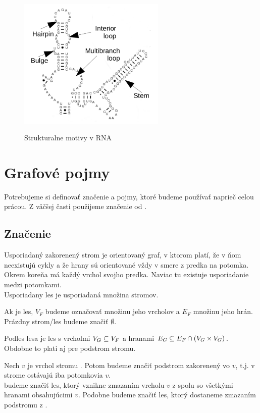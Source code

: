 \begin{figure}[H]
\centering
\includegraphics[width=70mm, height=70mm]{../img/struktury_v_rna.png}
\caption{Strukturalne motivy v RNA}
\label{obr:RNA_motifs}
\end{figure}

\section{Grafové pojmy}

Potrebujeme si definovať značenie a pojmy, ktoré budeme používať naprieč celou prácou.
Z väčšej časti použijeme značenie od \citet{RTED}.

\subsection{Značenie}

\begin{definice}\label{def:strom}
  Usporiadaný zakorenený strom je orientovaný graf, v ktorom platí, že v ňom neexistujú cykly
  a že hrany sú orientované vždy v smere z predka na potomka.
  Okrem koreňa má každý vrchol svojho predka. Naviac tu existuje usporiadanie medzi potomkami.
  \\
  Usporiadany les je usporiadaná množina stromov.
\end{definice}

Ak  je les, $V_F$ budeme označovať množinu jeho vrcholov a $E_F$ množinu jeho hrán.
Prázdny strom/les budeme značiť $\emptyset$.

Podles lesa  je les  s vrcholmi $V_{G} \subseteq V_{F}$
a hranami $E_{G} \subseteq E_{F} \cap (V_{G} \times V_{G})$.
Obdobne to plati aj pre podstrom stromu.

Nech $v$ je vrchol stromu . Potom  budeme značiť podstrom  zakorenený vo $v$,
t.j. v strome ostávajú iba potomkovia $v$.
\\
 budeme značiť les, ktorý vznikne zmazaním vrcholu $v$ z  spolu so
všetkými hranami obsahujúcimi $v$. Podobne  budeme značiť les, ktorý
dostaneme zmazaním podstromu  z .

